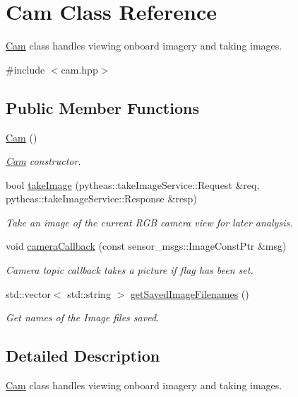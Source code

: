 \hypertarget{class_cam}{}\section{Cam Class Reference}
\label{class_cam}


\hyperlink{class_cam}{Cam} class handles viewing onboard imagery and taking images.  




{\ttfamily \#include $<$cam.\+hpp$>$}

\subsection*{Public Member Functions}
\begin{DoxyCompactItemize}
\item 
\hyperlink{class_cam_a687a277355267302cbacb0713f51a136}{Cam} ()
\begin{DoxyCompactList}\small\item\em \hyperlink{class_cam}{Cam} constructor. \end{DoxyCompactList}\item 
bool \hyperlink{class_cam_a75754ce45e540cb279b408a1749dc01e}{take\+Image} (pytheas\+::take\+Image\+Service\+::\+Request \&req, pytheas\+::take\+Image\+Service\+::\+Response \&resp)
\begin{DoxyCompactList}\small\item\em Take an image of the current R\+GB camera view for later analysis. \end{DoxyCompactList}\item 
void \hyperlink{class_cam_af3c02a8786dc1c4cf1e4587edd28fa94}{camera\+Callback} (const sensor\+\_\+msgs\+::\+Image\+Const\+Ptr \&msg)
\begin{DoxyCompactList}\small\item\em Camera topic callback takes a picture if flag has been set. \end{DoxyCompactList}\item 
std\+::vector$<$ std\+::string $>$ \hyperlink{class_cam_a8ad5af2354661d3fdf432f8cc6ebacdd}{get\+Saved\+Image\+Filenames} ()
\begin{DoxyCompactList}\small\item\em Get names of the Image files saved. \end{DoxyCompactList}\end{DoxyCompactItemize}


\subsection{Detailed Description}
\hyperlink{class_cam}{Cam} class handles viewing onboard imagery and taking images. 

